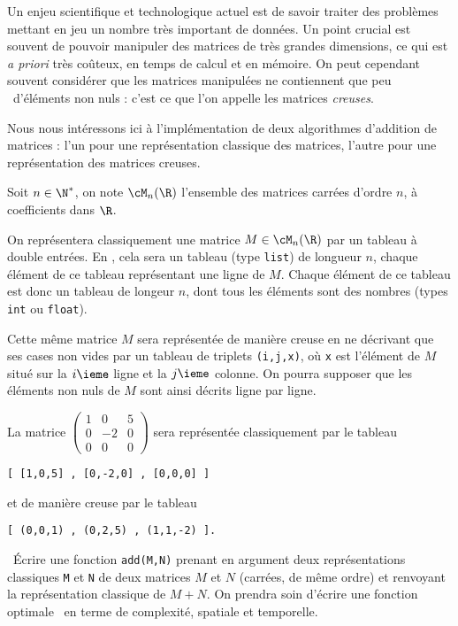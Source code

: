 Un enjeu scientifique et technologique actuel est de savoir traiter des problèmes mettant en jeu un nombre très important de données.
Un point crucial est souvent de pouvoir manipuler des matrices de très grandes dimensions, ce qui est \emph{a priori} très coûteux, en temps de calcul et en mémoire. 
On peut cependant souvent considérer que les matrices manipulées ne contiennent que \og peu \fg\ d'éléments non nuls : c'est ce que l'on appelle les matrices \emph{creuses}. 

Nous nous intéressons ici à l'implémentation de deux algorithmes d'addition de matrices : l'un pour une représentation classique des matrices, l'autre pour une représentation des matrices creuses.

Soit $n\in\N^\ast$, on note $\cM_n(\R)$ l'ensemble des matrices carrées d'ordre $n$, à coefficients dans $\R$.  

On représentera classiquement une matrice $M\in \cM_n(\R)$ par un tableau à double entrées. 
En \python, cela sera un tableau (type \texttt{list}) de longueur $n$, chaque élément de ce tableau représentant une ligne de $M$.
Chaque élément de ce tableau est donc un tableau de longeur $n$, dont tous les éléments sont des nombres (types \texttt{int} ou \texttt{float}).

Cette même matrice $M$ sera représentée de manière creuse en ne décrivant que ses cases non vides par un tableau de triplets \texttt{(i,j,x)}, où \texttt{x} est l'élément de $M$ situé sur la $i\ieme$ ligne et la $j\ieme$ colonne. 
On pourra supposer que les éléments non nuls de $M$ sont ainsi décrits ligne par ligne. 

\begin{exemple}
  La matrice $\begin{pmatrix} 1&0&5 \\ 0&-2&0 \\ 0&0&0 \end{pmatrix}$ sera représentée classiquement par le tableau 
\begin{verbatim}
[ [1,0,5] , [0,-2,0] , [0,0,0] ]
\end{verbatim}
et de manière creuse par le tableau 
\begin{verbatim}
[ (0,0,1) , (0,2,5) , (1,1,-2) ].
\end{verbatim}
\end{exemple}

\question\ \'Ecrire une fonction \texttt{add(M,N)} prenant en argument deux représentations classiques \texttt{M} et \texttt{N} de deux matrices $M$ et $N$ (carrées, de même ordre) et renvoyant la représentation classique de $M+N$. 
On prendra soin d'écrire une fonction \og optimale \fg\ en terme de complexité, spatiale et temporelle. 


